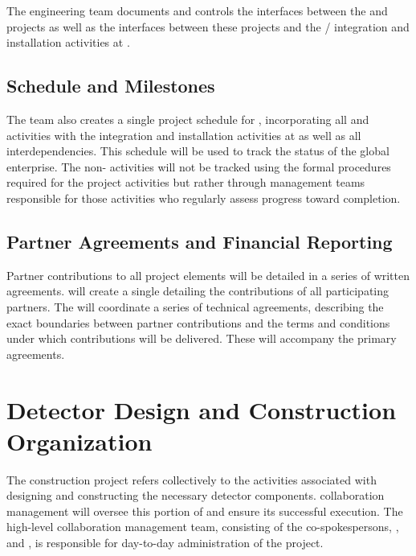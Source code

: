 The  engineering team documents and
controls the interfaces between the  and  
projects as well as the interfaces between these projects and the 
/ integration and installation activities 
at .  


\subsection{Schedule and Milestones}
\label{sec:dune_schedule}

The  team also creates a single 
project schedule for , incorporating all 
 and  activities with the 
integration and installation activities at  
as well as all interdependencies.  This schedule will 
be used to track the status of the global enterprise.  
  The non- activities 
will not be tracked using the formal  procedures 
required for the  project activities but rather 
through management teams responsible for those activities who regularly assess progress toward completion.  


\subsection{Partner Agreements and Financial Reporting}
\label{sec:dune_agreements}

Partner contributions to all project elements will be detailed 
in a series of written agreements.   will create a single  
detailing the contributions of all participating partners.  
 The   will coordinate a series of technical agreements, describing the exact 
boundaries between partner contributions and the terms and 
conditions under which contributions will be delivered. These will accompany
 the primary agreements.   

\section{Detector Design and Construction Organization}
\label{sec:es-tc-det-const}

The   construction project refers collectively 
to the activities associated with designing and constructing the
necessary detector components.   collaboration management 
will oversee this portion of  and 
ensure its successful execution.  The high-level  
collaboration management team, consisting of the co-spokespersons, 
, and , is responsible for day-to-day 
administration of the project.  

